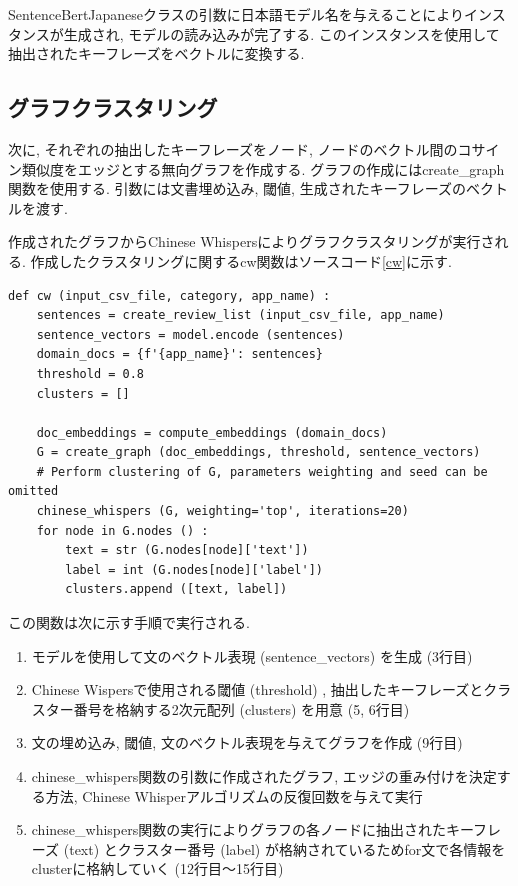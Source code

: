 

SentenceBertJapaneseクラスの引数に日本語モデル名を与えることによりインスタンスが生成され, モデルの読み込みが完了する. このインスタンスを使用して抽出されたキーフレーズをベクトルに変換する. 


\subsection{グラフクラスタリング}
次に, それぞれの抽出したキーフレーズをノード, ノードのベクトル間のコサイン類似度をエッジとする無向グラフを作成する. グラフの作成にはcreate\_graph関数を使用する. 引数には文書埋め込み, 閾値, 生成されたキーフレーズのベクトルを渡す. 

作成されたグラフからChinese Whispersによりグラフクラスタリングが実行される. 作成したクラスタリングに関するcw関数はソースコード\ref{cw}に示す. 

\begin{lstlisting}[caption=cw関数,label=cw]
  def cw (input_csv_file, category, app_name) :
    sentences = create_review_list (input_csv_file, app_name) 
    sentence_vectors = model.encode (sentences) 
    domain_docs = {f'{app_name}': sentences}
    threshold = 0.8
    clusters = []
    
    doc_embeddings = compute_embeddings (domain_docs) 
    G = create_graph (doc_embeddings, threshold, sentence_vectors) 
    # Perform clustering of G, parameters weighting and seed can be omitted
    chinese_whispers (G, weighting='top', iterations=20) 
    for node in G.nodes () :
        text = str (G.nodes[node]['text']) 
        label = int (G.nodes[node]['label']) 
        clusters.append ([text, label]) 
\end{lstlisting}

この関数は次に示す手順で実行される. 

\begin{enumerate}
  \item モデルを使用して文のベクトル表現 (sentence\_vectors) を生成 (3行目) 
  \item Chinese Wispersで使用される閾値 (threshold) , 抽出したキーフレーズとクラスター番号を格納する2次元配列 (clusters) を用意 (5, 6行目)
  \item 文の埋め込み, 閾値, 文のベクトル表現を与えてグラフを作成 (9行目)
  \item chinese\_whispers関数の引数に作成されたグラフ, エッジの重み付けを決定する方法, Chinese Whisperアルゴリズムの反復回数を与えて実行
  \item chinese\_whispers関数の実行によりグラフの各ノードに抽出されたキーフレーズ (text) とクラスター番号 (label) が格納されているためfor文で各情報をclusterに格納していく (12行目〜15行目)
\end{enumerate}

